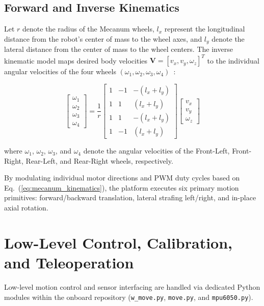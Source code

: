 \subsection{Forward and Inverse Kinematics}
Let $r$ denote the radius of the Mecanum wheels, $l_x$ represent the longitudinal distance from the robot's center of mass to the wheel axes, and $l_y$ denote the lateral distance from the center of mass to the wheel centers. The inverse kinematic model maps desired body velocities $\mathbf{V} = [v_x, v_y, \omega_z]^T$ to the individual angular velocities of the four wheels $(\omega_1, \omega_2, \omega_3, \omega_4)$~\citep{siegwart2011introduction}:

\begin{equation}
\begin{bmatrix}
\omega_1 \\
\omega_2 \\
\omega_3 \\
\omega_4
\end{bmatrix}
= \frac{1}{r}
\begin{bmatrix}
1 & -1 & -(l_x + l_y) \\
1 &  1 &  (l_x + l_y) \\
1 &  1 & -(l_x + l_y) \\
1 & -1 &  (l_x + l_y)
\end{bmatrix}
\begin{bmatrix}
v_x \\
v_y \\
\omega_z
\end{bmatrix}
\label{eq:mecanum_kinematics}
\end{equation}

where $\omega_1$, $\omega_2$, $\omega_3$, and $\omega_4$ denote the angular velocities of the Front-Left, Front-Right, Rear-Left, and Rear-Right wheels, respectively.

By modulating individual motor directions and PWM duty cycles based on Eq.~(\ref{eq:mecanum_kinematics}), the platform executes six primary motion primitives: forward/backward translation, lateral strafing left/right, and in-place axial rotation.

\section{Low-Level Control, Calibration, and Teleoperation}
Low-level motion control and sensor interfacing are handled via dedicated Python modules within the onboard repository (\texttt{w\_move.py}, \texttt{move.py}, and \texttt{mpu6050.py}).

